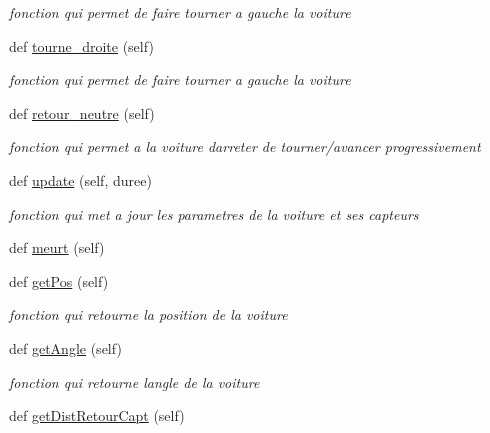 \begin{DoxyCompactItemize}
\begin{DoxyCompactList}\small\item\em fonction qui permet de faire tourner a gauche la voiture \end{DoxyCompactList}\item 
def \hyperlink{classsrc_1_1_voiture_1_1voiture_1_1_voiture_ad32e5359e63f20d848ef161a6926a082}{tourne\+\_\+droite} (self)
\begin{DoxyCompactList}\small\item\em fonction qui permet de faire tourner a gauche la voiture \end{DoxyCompactList}\item 
def \hyperlink{classsrc_1_1_voiture_1_1voiture_1_1_voiture_ab206cd7fe32ba652d0463f9910bf444a}{retour\+\_\+neutre} (self)
\begin{DoxyCompactList}\small\item\em fonction qui permet a la voiture d\textquotesingle{}arreter de tourner/avancer progressivement \end{DoxyCompactList}\item 
def \hyperlink{classsrc_1_1_voiture_1_1voiture_1_1_voiture_aacae4707fab946e85c1a4599f920dd47}{update} (self, duree)
\begin{DoxyCompactList}\small\item\em fonction qui met a jour les parametres de la voiture et ses capteurs \end{DoxyCompactList}\item 
def \hyperlink{classsrc_1_1_voiture_1_1voiture_1_1_voiture_a67f1af78ea71b0d6ccfcfe272a6be4c0}{meurt} (self)
\item 
def \hyperlink{classsrc_1_1_voiture_1_1voiture_1_1_voiture_adf2c8f1fe4e59541e49ad034ebb15c99}{get\+Pos} (self)
\begin{DoxyCompactList}\small\item\em fonction qui retourne la position de la voiture \end{DoxyCompactList}\item 
def \hyperlink{classsrc_1_1_voiture_1_1voiture_1_1_voiture_a3df91fedd037cbd745bfeffb1afd2a32}{get\+Angle} (self)
\begin{DoxyCompactList}\small\item\em fonction qui retourne l\textquotesingle{}angle de la voiture \end{DoxyCompactList}\item 
def \hyperlink{classsrc_1_1_voiture_1_1voiture_1_1_voiture_afd663041ade2522f1137b38c78929f63}{get\+Dist\+Retour\+Capt} (self)

\end{DoxyCompactItemize}
